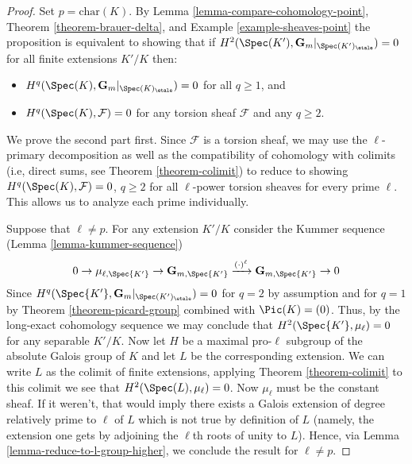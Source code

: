 \begin{proof}
Set $p = \text{char}(K)$.
By Lemma \ref{lemma-compare-cohomology-point},
Theorem \ref{theorem-brauer-delta},
and Example \ref{example-sheaves-point}
the proposition is equivalent to showing that if 
$H^2(\Spec(K'),\mathbf{G}_m|_{\Spec(K')_\etale}) = 0$
for all finite extensions $K'/K$ then:
\begin{itemize}
\item $H^q(\Spec(K),\mathbf{G}_m|_{\Spec(K)_\etale}) = 0$
for all $q \geq 1$, and
\item $H^q(\Spec(K),\mathcal{F}) = 0$
for any torsion sheaf $\mathcal{F}$ and any $q \geq 2$.
\end{itemize}
We prove the second part first.
Since $\mathcal{F}$ is a torsion sheaf, we may use the 
$\ell$-primary decomposition as well as the compatibility of
cohomology with colimits (i.e, direct sums, see Theorem \ref{theorem-colimit})
to reduce to showing  $H^q(\Spec(K),\mathcal{F}) = 0$, $q \geq 2$
for all $\ell$-power torsion sheaves for every prime $\ell$. This 
allows us to analyze each prime individually.

\medskip\noindent
Suppose that $\ell \neq p$. For any extension $K'/K$
consider the Kummer sequence (Lemma \ref{lemma-kummer-sequence})
$$
0 \to
\mu_{\ell, \Spec{K'}} \to
\mathbf{G}_{m, \Spec{K'}} \xrightarrow{(\cdot)^{\ell}}
\mathbf{G}_{m, \Spec{K'}} \to 0
$$
Since $H^q(\Spec{K'},\mathbf{G}_m|_{\Spec(K')_\etale}) = 0$
for $q = 2$ by assumption  and for $q = 1$ by
Theorem \ref{theorem-picard-group} combined with
$\Pic(K) = (0)$. Thus, by the long-exact cohomology 
sequence we may conclude that $H^2(\Spec{K'}, \mu_\ell) = 0$ for 
any separable $K'/K$. Now let $H$ be a maximal pro-$\ell$ subgroup
of the absolute Galois group of $K$ and let $L$ be the 
corresponding extension. We can write $L$ as the colimit of finite extensions, 
applying Theorem \ref{theorem-colimit} to this colimit we see that
$H^2(\Spec(L), \mu_\ell) = 0$.
Now $\mu_\ell$ must be the constant sheaf. If it weren't, that would imply
there exists a Galois extension of degree relatively prime to 
$\ell$ of $L$ which is not true by definition of $L$ (namely, the extension
one gets by adjoining the  $\ell$th roots of unity to $L$).
Hence, via Lemma \ref{lemma-reduce-to-l-group-higher},
we conclude the result for $\ell \neq p$. 


\end{proof}
